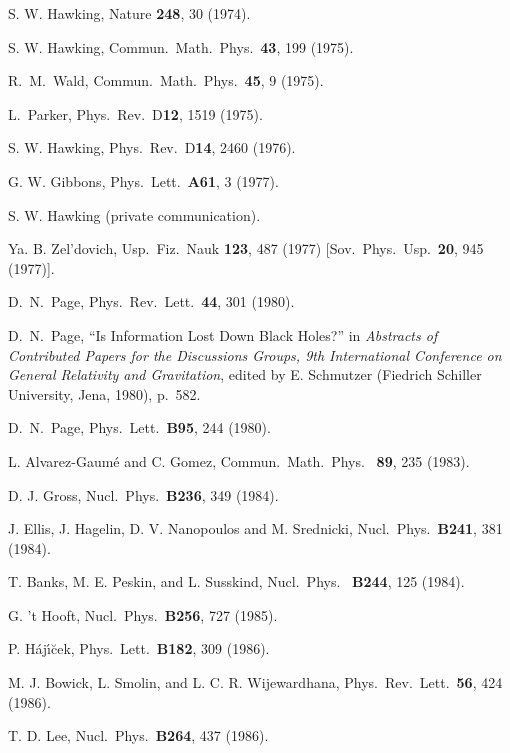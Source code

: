 \baselineskip 13.5pt
	\begin{thebibliography}{999}

 S. W. Hawking, Nature {\bf 248}, 30 (1974).

 S. W. Hawking, Commun.\ Math.\ Phys.\ {\bf 43}, 199
(1975).

 R.\ M.\ Wald, Commun.\ Math.\ Phys.\ {\bf 45}, 9
(1975).

 L.\ Parker, Phys.\ Rev.\ D{\bf12}, 1519 (1975).

 S. W. Hawking,  Phys.\ Rev.\ D{\bf14}, 2460 (1976).

 G. W. Gibbons, Phys.\ Lett.\ {\bf A61}, 3 (1977).

 S. W. Hawking (private communication).

 Ya. B. Zel'dovich, Usp.\ Fiz.\ Nauk {\bf 123}, 487
(1977)
[Sov.\ Phys.\ Usp.\ {\bf 20}, 945 (1977)].

 D.\ N.\ Page, Phys.\ Rev.\ Lett.\ {\bf 44}, 301
(1980).

 D.\ N.\ Page, ``Is Information Lost Down Black
Holes?'' in
{\em
Abstracts of Contributed Papers for the Discussions Groups, 9th
International
Conference on General Relativity and Gravitation}, edited by E.
Schmutzer
(Fiedrich Schiller University, Jena, 1980), p.~582.

 D.\ N.\ Page, Phys.\ Lett.\ {\bf B95}, 244 (1980).

 L. Alvarez-Gaum\'{e} and C. Gomez, Commun.\ Math.\
Phys.\ {\bf
89}, 235 (1983).

 D. J. Gross, Nucl.\ Phys.\ {\bf B236}, 349 (1984).

 J. Ellis, J. Hagelin, D. V. Nanopoulos and M.
Srednicki,
Nucl.\
Phys.\ {\bf B241}, 381 (1984).

 T. Banks, M. E. Peskin, and L. Susskind, Nucl.\ Phys.\
{\bf
B244}, 125 (1984).

 G. 't Hooft, Nucl.\ Phys.\ {\bf B256}, 727 (1985).

 P. H\'{a}j\'{\i}\u{c}ek, Phys.\ Lett.\ {\bf B182},
309 (1986).

\bibitem{BSW} M. J. Bowick, L. Smolin, and L. C. R. Wijewardhana,
Phys.\ Rev.\ Lett.\ {\bf 56}, 424 (1986).

\bibitem{Lee86} T. D. Lee, Nucl.\ Phys.\ {\bf B264}, 437 (1986).


\end{thebibliography}
